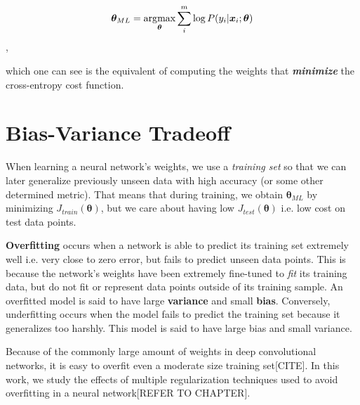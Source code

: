 \[\bm{\theta}_{ML} = \operatorname*{\arg\!\max}_{\bm{\theta}} \sum_{i}^{m} \log P(y_{i}|\bm{x}_{i};\bm{\theta})\],

which one can see is the equivalent of computing the weights that \textbf{\textit{minimize}} the cross-entropy cost function.




\section{Bias-Variance Tradeoff}
When learning a neural network's weights, we use a \textit{training set} so that we can later generalize
previously unseen data with high accuracy (or some other determined metric). That means that during training, we
obtain $\bm{\theta}_{ML}$ by minimizing $J_{train}(\bm{\theta})$, but we care about having low $J_{test}(\bm{\theta})$ i.e. low cost
on test data points.

\textbf{Overfitting} occurs when a network is able to predict its training set extremely well i.e. very close to zero error, but fails to predict
unseen data points. This is because the network's weights have been extremely fine-tuned to \textit{fit} its training data, but do not fit or represent
data points outside of its training sample.
An overfitted model is said to have large \textbf{variance} and small \textbf{bias}. Conversely, underfitting occurs when the model fails to predict
the training set because it generalizes too harshly. This model is said to have large bias and small variance.

Because of the commonly large amount of weights in deep convolutional networks, it is easy to overfit even a moderate size training set[CITE].
In this work, we study the effects of multiple regularization techniques used to avoid overfitting in a neural network[REFER TO CHAPTER].
